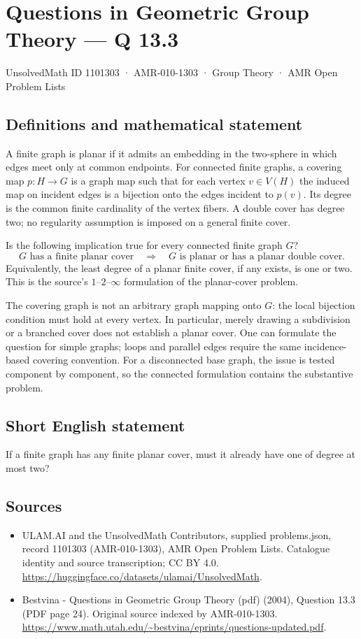 \documentclass[11pt,a4paper]{article}
\begin{document}
\section*{Questions in Geometric Group Theory — Q 13.3}\label{1101303}
{\small UnsolvedMath ID 1101303 · AMR-010-1303 · Group Theory · AMR Open Problem Lists}
\subsection{Definitions and mathematical statement}
A finite graph is planar if it admits an embedding in the two-sphere in which edges meet only at common endpoints. For connected finite graphs, a covering map $p:H\to G$ is a graph map such that for each vertex $v\in V(H)$ the induced map on incident edges is a bijection onto the edges incident to $p(v)$. Its degree is the common finite cardinality of the vertex fibers. A double cover has degree two; no regularity assumption is imposed on a general finite cover.

Is the following implication true for every connected finite graph $G$?
\[
 \text{$G$ has a finite planar cover}
 \quad\Longrightarrow\quad
 \text{$G$ is planar or has a planar double cover.}
\]
Equivalently, the least degree of a planar finite cover, if any exists, is one or two. This is the source's $1$--$2$--$\infty$ formulation of the planar-cover problem.

The covering graph is not an arbitrary graph mapping onto $G$: the local bijection condition must hold at every vertex. In particular, merely drawing a subdivision or a branched cover does not establish a planar cover. One can formulate the question for simple graphs; loops and parallel edges require the same incidence-based covering convention. For a disconnected base graph, the issue is tested component by component, so the connected formulation contains the substantive problem.
\subsection{Short English statement}
If a finite graph has any finite planar cover, must it already have one of degree at most two?
\subsection{Sources}
\begin{itemize}
\item[S1] ULAM.AI and the UnsolvedMath Contributors, supplied problems.json, record 1101303 (AMR-010-1303), AMR Open Problem Lists. Catalogue identity and source transcription; CC BY 4.0.
\url{https://huggingface.co/datasets/ulamai/UnsolvedMath}.
\item[S2] Bestvina - Questions in Geometric Group Theory (pdf) (2004), Question 13.3 (PDF page 24). Original source indexed by AMR-010-1303.
\url{https://www.math.utah.edu/~bestvina/eprints/questions-updated.pdf}.
\end{itemize}
\end{document}

